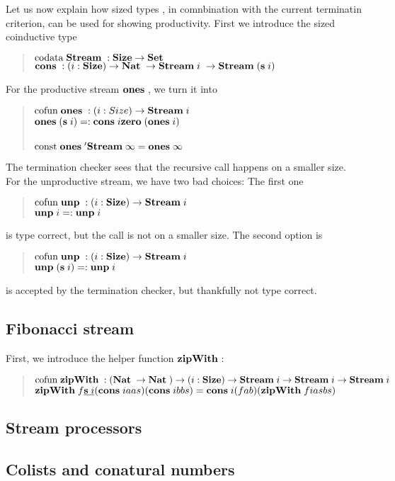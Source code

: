 Let us now explain how sized types , in comnbination with the current terminatin criterion, can be used for showing productivity.
First we introduce the sized coinductive type 
\begin{quote}
$\mathrm{codata}\; \mathbf{Stream}\; : \mathbf{Size} \rightarrow \mathbf{Set} $ 
\\
$\mathbf{cons}\; : ( i : \mathbf{Size} ) \rightarrow \mathbf{Nat}\; \rightarrow \mathbf{Stream}\; i \; \rightarrow \mathbf{Stream}\; (\mathbf{s}\; i) $
\end{quote}
For the productive stream $\mathbf{ones}\;$, we turn it into
\begin{quote}
$\mathrm{cofun}\; \mathbf{ones}\;: ( i : Size ) \rightarrow \mathbf{Stream}\; i $ 
\\
$\mathbf{ones}\; (\mathbf{s}\; i) = : \mathbf{cons}\; i \mathbf{zero}\; (\mathbf{ones}\; i)$
\\
\\
$\mathrm{const}\; \mathbf{ones}\;' \mathbf{Stream}\; \infty = \mathbf{ones}\; \infty $
\end{quote}
The termination checker sees that the recursive call happens on a smaller size.
For the unproductive stream, we have two bad choices:
The first one
\begin{quote}
$\mathrm{cofun}\; \mathbf{unp}\; : ( i : \mathbf{Size} ) \rightarrow \mathbf{Stream}\; i$ 
\\
$\mathbf{unp}\; i = : \mathbf{unp}\; i$
\end{quote}
is type correct, but the call is not on a smaller size.
The second option is
\begin{quote}
$\mathrm{cofun}\; \mathbf{unp}\; : ( i : \mathbf{Size} ) \rightarrow \mathbf{Stream}\; i$ 
\\
$\mathbf{unp}\; (\mathbf{s}\; i) = : \mathbf{unp}\; i$
\end{quote}
is accepted by the termination checker, but thankfully not type correct.

\subsection{Fibonacci stream}
First, we introduce the helper function $\mathbf{zipWith}\;$:
\begin{quote}
$\mathrm{cofun}\; \mathbf{zipWith}\; : (\mathbf{Nat}\; \rightarrow \mathbf{Nat}\; ) \rightarrow ( i : \mathbf{Size} ) \rightarrow \mathbf{Stream}\; i \rightarrow \mathbf{Stream}\; i \rightarrow \mathbf{Stream}\; i$ 
\\
$\mathbf{zipWith}\; f \underline{\mathbf{s}\; i} (\mathbf{cons}\; i a as) (\mathbf{cons}\; i b bs) =  \mathbf{cons}\; i (f a b) (\mathbf{zipWith}\; f i as bs)$
\end{quote}

\subsection{Stream processors}

\subsection{Colists and conatural numbers}

